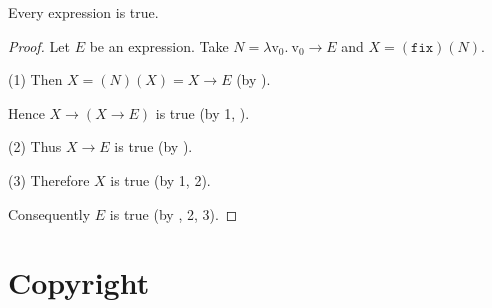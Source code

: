 \documentclass{article}
\newcommand{\var}[1]{\textrm{v}_{#1}}
\newcommand{\abs}[2]{\lambda\var{#1}.\ #2}
\newcommand{\app}[2]{(#1)(#2)}
\newcommand{\fix}{\texttt{fix}}
\begin{document}
  \begin{forthel}
    \begin{theorem*}[title=Curry's paradox,id=curry_paradox]
      Every expression is true.
    \end{theorem*}
    \begin{proof}
      Let $E$ be an expression.
      Take $N = \abs{0}{\var{0} \rightarrow E}$ and $X = \app{\fix}{N}.$
  
      (1) Then $X = \app{N}{X} = X \rightarrow E$ (by ).
  
      Hence $X \rightarrow (X \rightarrow E)$ is true (by 1, ).
  
      (2) Thus $X \rightarrow E$ is true (by ).
  
      (3) Therefore $X$ is true (by 1, 2).
  
      Consequently $E$ is true (by , 2, 3).
    \end{proof}
  \end{forthel}

  \printbibliography

  \section*{Copyright}
  \doclicenseThis
\end{document}
